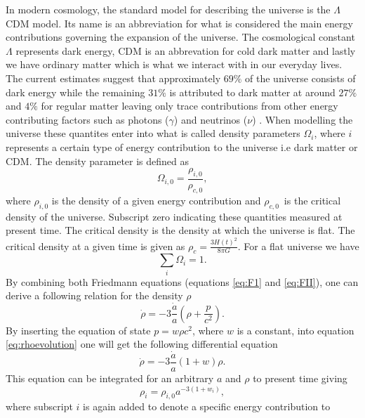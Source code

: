 In modern cosmology, the standard model for describing the universe is the $\Lambda$CDM model. Its name is an abbreviation for what 
is considered the main energy contributions governing the expansion of the universe. The cosmological constant $\Lambda$ represents dark energy, CDM is an abbrevation for cold dark matter
and lastly we have ordinary matter which is what we interact with in our
everyday lives. The current estimates suggest that approximately $69\%$ of the
universe consists of dark energy while the remaining $31\%$ is attributed to
dark matter at around 
$27\%$ and $4\%$ for regular matter leaving only trace contributions from other
energy contributing factors such as photons ($\gamma$) and neutrinos ($\nu$)
\cite{planckparameters}. When modelling the universe these quantites
enter into 
what is called density parameters $\Omega_i$, where $i$ represents a certain type of energy contribution to the universe i.e dark matter or CDM. The density parameter is defined as
\begin{equation}\label{eq:densityparameter}
    \Omega_{i,0} = \frac{\rho_{i,0}}{\rho_{c,0}},
\end{equation}
where $\rho_{i,0}$ is the density of a given energy contribution and $\rho_{c,0}$ is
the critical density of the universe. Subscript zero indicating these quantities
measured at present time. The critical density is the density at which the universe is flat. The critical density at a
given time is given as $\rho_c=\frac{3H(t)^2}{8\pi G}$. For a flat universe we have
\begin{equation}
    \sum_i \Omega_i = 1.
\end{equation}
By combining both Friedmann equations (equations \ref{eq:F1} and \ref{eq:FII}),
one can derive a following relation for the density $\rho$
\begin{equation}\label{eq:rhoevolution}
    \dot{\rho}=-3\frac{\dot{a}}{a}(\rho+\frac{p}{c^2}).
\end{equation}
By inserting the equation of state $p=w\rho c^2$, where $w$ is a constant,
into equation \ref{eq:rhoevolution} one will get the following differential
equation
\begin{equation}
    \dot{\rho}=-3\frac{\dot{a}}{a}(1+w)\rho.
\end{equation}
This equation can be integrated for an arbitrary $a$ and $\rho$ to present time
giving
\begin{equation}\label{eq:rho_i_evolution}
    \rho_i=\rho_{i,0}a^{-3(1+w_i)},
\end{equation}
where subscript $i$ is again added to denote a specific energy contribution to
